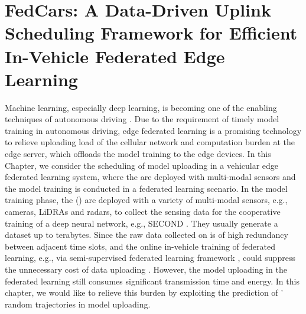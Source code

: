 
\chapter{FedCars: A Data-Driven Uplink Scheduling Framework for Efficient In-Vehicle Federated Edge Learning}
\label{ch2}

Machine learning, especially deep learning, is becoming one of the enabling techniques of autonomous driving \cite{ad-survey}.
Due to the requirement of timely model training in autonomous driving, edge federated learning is a promising technology to relieve uploading load of the cellular network and computation burden at the edge server, which offloads the model training to the edge devices.
In this Chapter, we consider the scheduling of model uploading in a vehicular edge federated learning system, where the {\IAVs} are deployed with multi-modal sensors and the model training is conducted in a federated learning scenario.
In the model training phase, the {\IAVFullnames} ({\IAVs}) are deployed with a variety of multi-modal sensors, e.g., cameras, LiDRAs and radars, to collect the sensing data for the cooperative training of a deep neural network, e.g., SECOND \cite{SECOND}.
They usually generate a dataset up to terabytes.
Since the raw data collected on {\IAVs} is of high redundancy between adjacent time slots, and the online in-vehicle training of federated learning, e.g., via semi-supervised federated learning framework \cite{icra2021-hong}, could suppress the unnecessary cost of data uploading \cite{vfl-survey}.
However, the model uploading in the federated learning still consumes significant transmission time and energy. In this chapter, we would like to relieve this burden by exploiting the prediction of {\IAVs}' random trajectories in model uploading.

